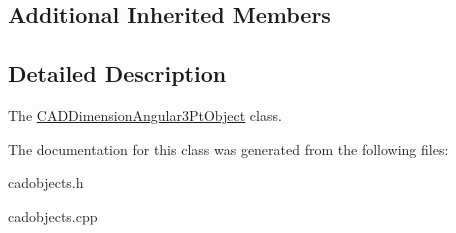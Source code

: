\subsection*{Additional Inherited Members}


\subsection{Detailed Description}
The \hyperlink{class_c_a_d_dimension_angular3_pt_object}{C\+A\+D\+Dimension\+Angular3\+Pt\+Object} class. 

The documentation for this class was generated from the following files\+:\begin{DoxyCompactItemize}
\item 
cadobjects.\+h\item 
cadobjects.\+cpp\end{DoxyCompactItemize}
